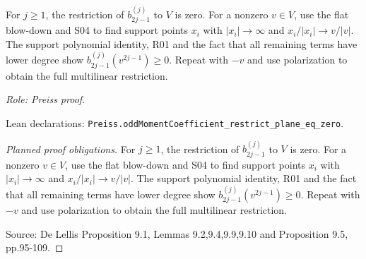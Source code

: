 \begin{lemma}
\label{lem:odd-coefficients-plane-zero}







For $j\geq1$, the restriction of $b_{2j-1}^{(j)}$ to $V$ is zero.
For a nonzero $v\in V$, use the flat blow-down and S04 to find support points
$x_i$ with $|x_i|\to\infty$ and $x_i/|x_i|\to v/|v|$.
The support polynomial identity, R01 and the fact that all remaining terms have
lower degree show $b_{2j-1}^{(j)}(v^{2j-1})\geq0$.
Repeat with $-v$ and use polarization to obtain the full multilinear restriction.
\par\emph{Role: Preiss proof.}
\par Lean declarations: \texttt{Preiss.oddMomentCoefficient\_restrict\_plane\_eq\_zero}.
\end{lemma}
\begin{proof}[Planned proof obligations]

For $j\geq1$, the restriction of $b_{2j-1}^{(j)}$ to $V$ is zero.
For a nonzero $v\in V$, use the flat blow-down and S04 to find support points
$x_i$ with $|x_i|\to\infty$ and $x_i/|x_i|\to v/|v|$.
The support polynomial identity, R01 and the fact that all remaining terms have
lower degree show $b_{2j-1}^{(j)}(v^{2j-1})\geq0$.
Repeat with $-v$ and use polarization to obtain the full multilinear restriction.
\par Source: De Lellis Proposition 9.1, Lemmas 9.2,9.4,9.9,9.10 and Proposition 9.5, pp.95-109.
\end{proof}

